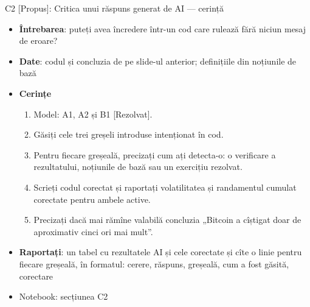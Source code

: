 \begin{frame}{C2 [Propus]: Critica unui răspuns generat de AI --- cerință}
\itemsize{\small}
\begin{itemize}
\item \textbf{Întrebarea}: puteți avea încredere într-un cod care rulează fără niciun mesaj de eroare?
\item \textbf{Date}: codul și concluzia de pe slide-ul anterior; definițiile din noțiunile de bază
\item \textbf{Cerințe}
\begin{enumerate}
    \item Model: A1, A2 și B1 [Rezolvat].
    \item Găsiți cele trei greșeli introduse intenționat în cod.
    \item Pentru fiecare greșeală, precizați cum ați detecta-o: o verificare a rezultatului, noțiunile de bază sau un exercițiu rezolvat.
    \item Scrieți codul corectat și raportați volatilitatea și randamentul cumulat corectate pentru ambele active.
    \item Precizați dacă mai rămîne valabilă concluzia „Bitcoin a cîștigat doar de aproximativ cinci ori mai mult”.
\end{enumerate}
\item \textbf{Raportați}: un tabel cu rezultatele AI și cele corectate și cîte o linie pentru fiecare greșeală, în formatul: cerere, răspuns, greșeală, cum a fost găsită, corectare
\item Notebook: secțiunea C2
\end{itemize}
\end{frame}

